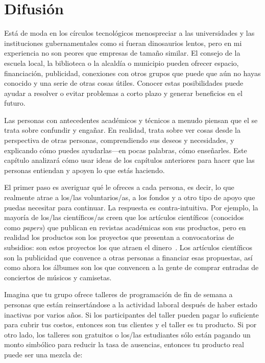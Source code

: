 \chapter{Difusión}\label{s:outreach}


Está de moda en los círculos tecnológicos 
menospreciar a las universidades y las instituciones gubernamentales como si fueran dinosaurios lentos, 
pero en mi experiencia no son peores que empresas de tamaño similar.
El consejo de la escuela local, la biblioteca o la alcaldía o municipio pueden ofrecer espacio, 
financiación, publicidad, conexiones con otros grupos que puede que aún no hayas conocido 
y una serie de otras cosas útiles. 
Conocer estas posibilidades puede ayudar a resolver o evitar problemas a corto plazo 
y generar beneficios en el futuro.


Las personas con antecedentes académicos y técnicos a menudo piensan que 
el  se trata sobre confundir y engañar. 
En realidad, trata sobre ver cosas desde la perspectiva de otras personas, 
comprendiendo sus deseos y necesidades, y explicando cómo puedes ayudarlas---en pocas palabras, 
cómo enseñarles.
Este capítulo analizará cómo usar ideas de los capítulos anteriores 
para hacer que las personas entiendan y apoyen lo que estás haciendo.

El primer paso es averiguar qué le ofreces a cada persona, es decir, 
lo que realmente atrae a los/las voluntarios/as, a los fondos y a otro tipo de apoyo que puedas necesitar para continuar.
La respuesta es contra-intuitiva.
Por ejemplo, la mayoría de los/las científicos/as creen 
que los artículos científicos (conocidos como \emph{papers}) 
que publican en revistas académicas son sus productos, 
pero en realidad los productos son los proyectos que presentan a convocatorias de subsidios: 
son estos proyectos los que atraen el dinero~\cite{Kuch2011}.
Los artículos científicos son la publicidad que convence a otras personas a financiar esas propuestas, 
así como ahora los álbumes son los que convencen a la gente de comprar entradas de conciertos de músicos y camisetas.

Imagina que tu grupo ofrece talleres de programación de fin de semana 
a personas que están reinsertándose a la actividad laboral después de haber estado inactivas por varios años.
Si los participantes del taller pueden pagar lo suficiente para cubrir tus costos, 
entonces son tus clientes y el taller es tu producto. Si por otro lado, los talleres son gratuitos 
o los/las estudiantes sólo están pagando un monto simbólico para reducir la tasa de ausencias, 
entonces tu producto real puede ser una mezcla de: 

